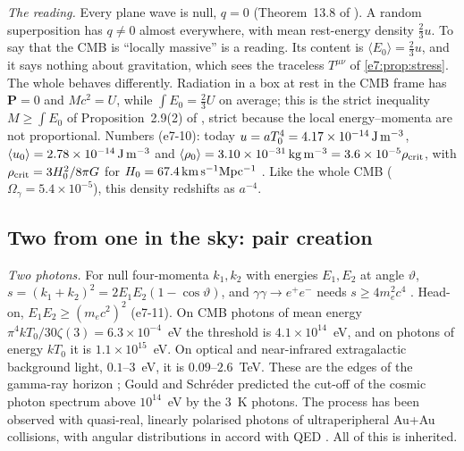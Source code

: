 \emph{The reading.} Every plane wave is null, $q=0$ (Theorem~13.8 of \cite{ES17}). A random superposition has $q\neq0$ almost everywhere, with
mean rest-energy density $\tfrac23u$. To say that the CMB is ``locally massive'' is a reading. Its content is $\langle E_0\rangle=\tfrac23u$, and it
says nothing about gravitation, which sees the traceless $T^{\mu\nu}$ of \cref{e7:prop:stress}. The whole behaves differently. Radiation in a box at
rest in the CMB frame has $\mathbf P=0$ and $Mc^2=U$, while $\int E_0=\tfrac23U$ on average; this is the strict inequality $M\ge\int E_0$ of
Proposition~2.9(2) of \cite{RE}, strict because the local energy--momenta are not proportional. Numbers (e7-10): today
$u=aT_0^4=4.17\times10^{-14}\,{\rm J\,m^{-3}}$, $\langle u_0\rangle=2.78\times10^{-14}\,{\rm J\,m^{-3}}$ and
$\langle\rho_0\rangle=3.10\times10^{-31}\,{\rm kg\,m^{-3}}=3.6\times10^{-5}\rho_{\rm crit}$, with $\rho_{\rm crit}=3H_0^2/8\pi G$ for
$H_0=67.4\,{\rm km\,s^{-1}Mpc^{-1}}$ \cite{Planck18VI}. Like the whole CMB ($\Omega_\gamma=5.4\times10^{-5}$), this density redshifts as $a^{-4}$.

\subsection{Two from one in the sky: pair creation}
\label{e7:sec:pairs}

\emph{Two photons.} For null four-momenta $k_1,k_2$ with energies $E_1,E_2$ at angle $\vartheta$, $s=(k_1+k_2)^2=2E_1E_2(1-\cos\vartheta)$, and
$\gamma\gamma\to e^+e^-$ needs $s\ge4m_e^2c^4$ \cite{BreitWheeler34}. Head-on, $E_1E_2\ge(m_ec^2)^2$ (e7-11). On CMB photons of mean energy
$\pi^4kT_0/30\zeta(3)=6.3\times10^{-4}$~eV the threshold is $4.1\times10^{14}$~eV, and on photons of energy $kT_0$ it is $1.1\times10^{15}$~eV. On
optical and near-infrared extragalactic background light, $0.1$--$3$~eV, it is $0.09$--$2.6$~TeV. These are the edges of the gamma-ray horizon
\cite{Nikishov62,GouldSchreder67,DwekKrennrich13}; Gould and Schr\'eder predicted the cut-off of the cosmic photon spectrum above $10^{14}$~eV by
the $3$~K photons. The process has been observed with quasi-real, linearly polarised photons of ultraperipheral Au+Au collisions, with angular
distributions in accord with QED \cite{STAR21}. All of this is inherited.


